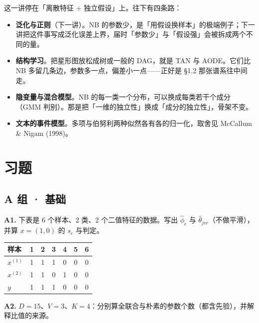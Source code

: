 \documentclass[11pt,a4paper,fontset=windows,zihao=-4]{ctexart}
\newcommand{\tabhead}{\sffamily\bfseries\color{navy}}
\begin{document}
这一讲停在「离散特征 + 独立假设」上。往下有四条路：

\begin{itemize}
  \item \textbf{泛化与正则}（下一讲）。NB 的参数少，是「用假设换样本」的极端例子；下一讲把这件事写成泛化误差上界，届时「参数少」与「假设强」会被拆成两个不同的量。
  \item \textbf{结构学习}。把星形图放松成树或一般的 DAG，就是 TAN 与 AODE。它们比 NB 多留几条边，参数多一点，偏差小一点——正好是 §1.2 那张谱系往中间走。
  \item \textbf{隐变量与混合模型}。NB 的每一类一个分布，可以换成每类若干个成分（GMM 判别）。那是把「一维的独立性」换成「成分的独立性」，骨架不变。
  \item \textbf{文本的事件模型}。多项与伯努利两种似然各有各的归一化，取舍见 McCallum \& Nigam (1998)。
\end{itemize}


\clearpage
\section*{习题}
\setlength{\parskip}{0.62em}

\subsection*{A 组 · 基础}

\noindent\textbf{A1.} 下表是 6 个样本、2 类、2 个二值特征的数据。写出 $\hat\phi_c$ 与 $\hat\theta_{jvc}$（不做平滑），并算 $x=(1,0)$ 的 $s_c$ 与判定。

\begin{center}
\small
\begin{tabular}{@{}lcccccc@{}}
\toprule
\rowcolor{navy!7}
\tabhead 样本 & 1 & 2 & 3 & 4 & 5 & 6\\
\midrule
$x^{(1)}$ & 1 & 1 & 1 & 0 & 0 & 0\\
$x^{(2)}$ & 1 & 1 & 0 & 1 & 0 & 0\\
$y$ & 1 & 1 & 1 & 0 & 0 & 0\\
\bottomrule
\end{tabular}
\end{center}

\noindent\textbf{A2.} $D=15$、$V=3$、$K=4$：分别算全联合与朴素的参数个数（都含先验），并解释比值的来源。
\end{document}
